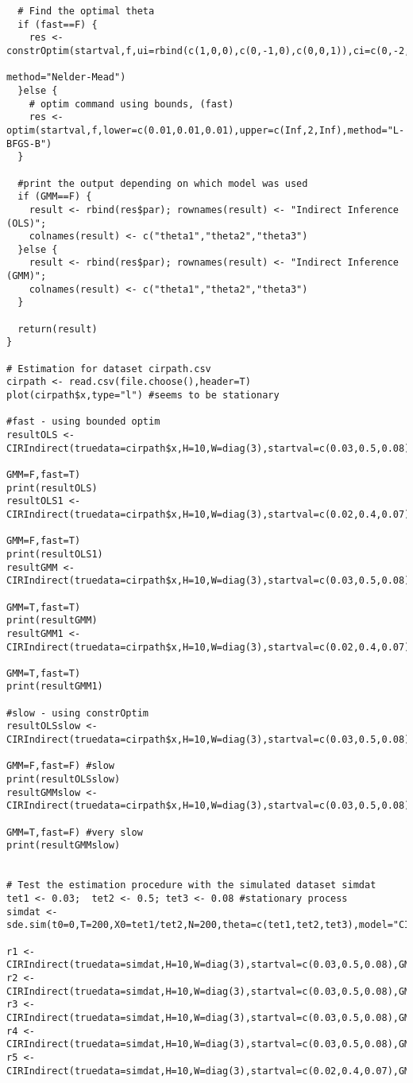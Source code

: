 \documentclass{article}
\begin{document}
\begin{solution}
\begin{verbatim}
  # Find the optimal theta
  if (fast==F) {
    res <- constrOptim(startval,f,ui=rbind(c(1,0,0),c(0,-1,0),c(0,0,1)),ci=c(0,-2,0),
                                                                 method="Nelder-Mead")
  }else {
    # optim command using bounds, (fast)
    res <- optim(startval,f,lower=c(0.01,0.01,0.01),upper=c(Inf,2,Inf),method="L-BFGS-B") 
  }

  #print the output depending on which model was used
  if (GMM==F) {
    result <- rbind(res$par); rownames(result) <- "Indirect Inference (OLS)"; 
    colnames(result) <- c("theta1","theta2","theta3")
  }else {
    result <- rbind(res$par); rownames(result) <- "Indirect Inference (GMM)"; 
    colnames(result) <- c("theta1","theta2","theta3")
  }

  return(result)
}

# Estimation for dataset cirpath.csv
cirpath <- read.csv(file.choose(),header=T)
plot(cirpath$x,type="l") #seems to be stationary

#fast - using bounded optim
resultOLS <- CIRIndirect(truedata=cirpath$x,H=10,W=diag(3),startval=c(0.03,0.5,0.08),
                                                                      GMM=F,fast=T)
print(resultOLS)
resultOLS1 <- CIRIndirect(truedata=cirpath$x,H=10,W=diag(3),startval=c(0.02,0.4,0.07),
                                                                      GMM=F,fast=T)
print(resultOLS1)
resultGMM <- CIRIndirect(truedata=cirpath$x,H=10,W=diag(3),startval=c(0.03,0.5,0.08),
                                                                      GMM=T,fast=T)
print(resultGMM)
resultGMM1 <- CIRIndirect(truedata=cirpath$x,H=10,W=diag(3),startval=c(0.02,0.4,0.07),
                                                                      GMM=T,fast=T)
print(resultGMM1)

#slow - using constrOptim
resultOLSslow <- CIRIndirect(truedata=cirpath$x,H=10,W=diag(3),startval=c(0.03,0.5,0.08),
                                                                      GMM=F,fast=F) #slow
print(resultOLSslow)
resultGMMslow <- CIRIndirect(truedata=cirpath$x,H=10,W=diag(3),startval=c(0.03,0.5,0.08),
                                                                      GMM=T,fast=F) #very slow
print(resultGMMslow)


# Test the estimation procedure with the simulated dataset simdat
tet1 <- 0.03;  tet2 <- 0.5; tet3 <- 0.08 #stationary process
simdat <- sde.sim(t0=0,T=200,X0=tet1/tet2,N=200,theta=c(tet1,tet2,tet3),model="CIR")

r1 <- CIRIndirect(truedata=simdat,H=10,W=diag(3),startval=c(0.03,0.5,0.08),GMM=F,fast=T)
r2 <- CIRIndirect(truedata=simdat,H=10,W=diag(3),startval=c(0.03,0.5,0.08),GMM=F,fast=F)
r3 <- CIRIndirect(truedata=simdat,H=10,W=diag(3),startval=c(0.03,0.5,0.08),GMM=T,fast=T)
r4 <- CIRIndirect(truedata=simdat,H=10,W=diag(3),startval=c(0.03,0.5,0.08),GMM=T,fast=F)
r5 <- CIRIndirect(truedata=simdat,H=10,W=diag(3),startval=c(0.02,0.4,0.07),GMM=T,fast=T)

\end{verbatim}
\end{solution}
\end{document}
